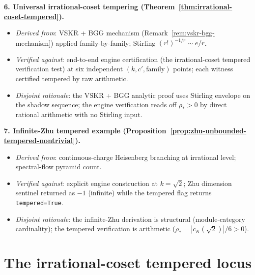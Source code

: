 \textbf{6. Universal irrational-coset tempering
(Theorem~\ref{thm:irrational-coset-tempered}).}
\begin{itemize}[nosep]
\item \emph{Derived from}: VSKR + BGG mechanism
 (Remark~\ref{rem:vskr-bgg-mechanism}) applied family-by-family;
 Stirling $(r!)^{-1/r} \sim e/r$.
\item \emph{Verified against}: end-to-end engine certification
 (the irrational-coset tempered verification test) at six
 independent $(k, c', \text{family})$ points; each witness
 certified tempered by raw arithmetic.
\item \emph{Disjoint rationale}: the VSKR + BGG analytic proof
 uses Stirling envelope on the shadow sequence; the engine
 verification reads off $\rho_* > 0$ by direct rational arithmetic
 with no Stirling input.
\end{itemize}

\textbf{7. Infinite-Zhu tempered example
(Proposition~\ref{prop:zhu-unbounded-tempered-nontrivial}).}
\begin{itemize}[nosep]
\item \emph{Derived from}: continuous-charge Heisenberg branching at
 irrational level; spectral-flow pyramid count.
\item \emph{Verified against}: explicit engine construction at $k =
 \sqrt{2}$; Zhu dimension sentinel returned as $-1$
 (infinite) while the tempered flag returns
 \texttt{tempered=True}.
\item \emph{Disjoint rationale}: the infinite-Zhu derivation is
 structural (module-category cardinality); the tempered
 verification is arithmetic ($\rho_* = |c_K(\sqrt{2})|/6 > 0$).
\end{itemize}

\section{The irrational-coset tempered locus}
\label{sec:irrational-cosets-location}

